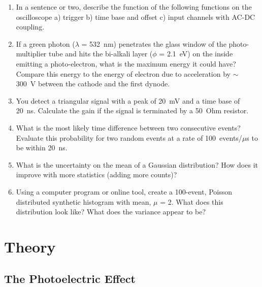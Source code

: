 \documentclass[10pt,aps,twocolumn,secnumarabic,balancelastpage,amsmath,amssymb,nofootinbib,floatfix]{revtex4}
\begin{document}
\begin{enumerate}
\item In a sentence or two, describe the function of the following functions on the oscilloscope a) trigger b) time base and offset c) input channels with AC-DC coupling.
\item If a green photon ($\lambda$ = 532~nm) penetrates the glass window of the photo-multiplier tube and hits the bi-alkali layer ($\phi$ = 2.1~eV) on the inside emitting a photo-electron, what is the maximum energy it could have? Compare this energy to the energy of electron due to acceleration by $\sim$ 300~V between the cathode and the first dynode.
\item You detect a triangular signal with a peak of 20~mV and a time base of 20~ns. Calculate the gain if the signal is terminated by a 50~Ohm resistor. 
\item What is the most likely time difference between two consecutive events? Evaluate this probability for two random events at a rate of 100~events/$\mu$s to be within 20~ns.
\item What is the uncertainty on the mean of a Gaussian distribution? How does it improve with more statistics (adding more counts)?
\item Using a computer program or online tool, create a 100-event, Poisson distributed synthetic histogram with mean, $\mu$ = 2. What does this distribution look like? What does the variance appear to be?


\end{enumerate}

\section{Theory}

\subsection{The Photoelectric Effect}
\end{document}
